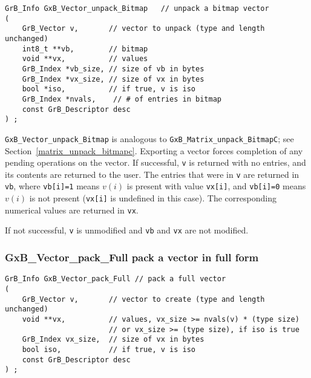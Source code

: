 \documentclass[12pt]{article}
\begin{document}
\begin{mdframed}[userdefinedwidth=6in]
{\footnotesize
\begin{verbatim}
GrB_Info GxB_Vector_unpack_Bitmap   // unpack a bitmap vector
(
    GrB_Vector v,       // vector to unpack (type and length unchanged)
    int8_t **vb,        // bitmap
    void **vx,          // values
    GrB_Index *vb_size, // size of vb in bytes
    GrB_Index *vx_size, // size of vx in bytes
    bool *iso,          // if true, v is iso
    GrB_Index *nvals,    // # of entries in bitmap
    const GrB_Descriptor desc
) ;
\end{verbatim}
} \end{mdframed}

\verb'GxB_Vector_unpack_Bitmap' is analogous to
\verb'GxB_Matrix_unpack_BitmapC'; see
Section~\ref{matrix_unpack_bitmapc}.
Exporting a vector forces completion of any pending operations on the vector.
If successful, \verb'v' is returned with no entries, and its contents are
returned to the user.
The entries that were in \verb'v' are returned in
\verb'vb', where \verb'vb[i]=1' means $v(i)$ is present with value
\verb'vx[i]', and \verb'vb[i]=0' means $v(i)$ is not present (\verb'vx[i]' is
undefined in this case).  The corresponding numerical values are returned in
\verb'vx'.

If not successful, \verb'v' is unmodified and \verb'vb' and \verb'vx' are not
modified.

\newpage
\subsubsection{{\sf GxB\_Vector\_pack\_Full} pack a vector in full form}
\label{vector_pack_full}

\begin{mdframed}[userdefinedwidth=6in]
{\footnotesize
\begin{verbatim}
GrB_Info GxB_Vector_pack_Full // pack a full vector
(
    GrB_Vector v,       // vector to create (type and length unchanged)
    void **vx,          // values, vx_size >= nvals(v) * (type size)
                        // or vx_size >= (type size), if iso is true
    GrB_Index vx_size,  // size of vx in bytes
    bool iso,           // if true, v is iso
    const GrB_Descriptor desc
) ;
\end{verbatim}
} \end{mdframed}
\end{document}
